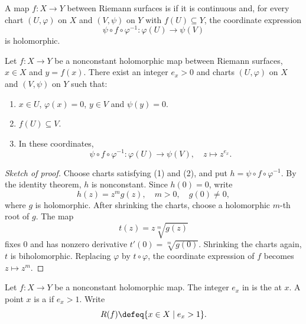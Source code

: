 \begin{definition}\label{Def:MF_holomorphic_map}
    A map $f : X \to Y$ between Riemann surfaces is  if it is continuous and, for every chart $(U, \varphi)$ on $X$ and $(V, \psi)$ on $Y$ with $f(U) \subseteq Y$, the coordinate expression
    \[
        \psi \circ f \circ \varphi^{-1} : \varphi(U) \to \psi(V)
    \]
    is holomorphic.
\end{definition}

\begin{proposition}\label{Prop:MF_local_normal_form}
    Let $f : X \to Y$ be a nonconstant holomorphic map between Riemann surfaces, $x \in X$ and $y = f(x)$. There exist an integer $e_x > 0$ and charts $(U, \varphi)$ on $X$ and $(V, \psi)$ on $Y$ such that:
    \begin{enumerate}[label=(\arabic*)]
        \item $x \in U$, $\varphi(x) = 0$, $y \in V$ and $\psi(y) = 0$.
        \item $f(U) \subseteq V$.
        \item In these coordinates,
        \[
            \psi \circ f \circ \varphi^{-1} : \varphi(U) \to \psi(V), \quad z \mapsto z^{e_x}.
        \]
    \end{enumerate}
\end{proposition}

\begin{proof}[Sketch of proof]
    Choose charts satisfying (1) and (2), and put $h = \psi \circ f \circ \varphi^{-1}$. By the identity theorem, $h$ is nonconstant. Since $h(0) = 0$, write
    \[
        h(z) = z^m g(z), \quad m > 0, \quad g(0) \neq 0,
    \]
    where $g$ is holomorphic. After shrinking the charts, choose a holomorphic $m$-th root of $g$. The map
    \[
        t(z) = z\sqrt[m]{g(z)}
    \]
    fixes $0$ and has nonzero derivative $t'(0) = \sqrt[m]{g(0)}$. Shrinking the charts again, $t$ is biholomorphic. Replacing $\varphi$ by $t \circ \varphi$, the coordinate expression of $f$ becomes $z \mapsto z^m$.
\end{proof}

\begin{definition}\label{Def:MF_ramification}
    Let $f : X \to Y$ be a nonconstant holomorphic map. The integer $e_x$ in  is the  at $x$. A point $x$ is a  if $e_x > 1$. Write
    \[
        R(f) \defeq \{x \in X \mid e_x > 1\}.
    \]
\end{definition}

